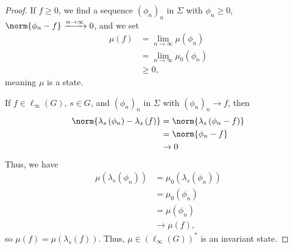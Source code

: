 \documentclass[10pt]{mypackage}
\begin{document}
\begin{proof}
  If $f \geq 0$, we find a sequence $\left(\phi_n\right)_n$ in $\Sigma$ with $\phi_n\geq 0$, $\norm{\phi_n - f}\xrightarrow{n\rightarrow\infty} 0$, and we set
  \begin{align*}
    \mu\left(f\right) &= \lim_{n\rightarrow\infty}\mu\left(\phi_n\right)\\
                      &= \lim_{n\rightarrow\infty}\mu_0\left(\phi_n\right)\\
                      &\geq 0,
  \end{align*}
  meaning $\mu$ is a state.\newline

  If $f\in \ell_{\infty}\left(G\right)$, $s\in G$, and $\left(\phi_n\right)_n$ in $\Sigma$ with $\left(\phi_n\right)_n\rightarrow f$, then
  \begin{align*}
    \norm{\lambda_s\left(\phi_n\right) - \lambda_s\left(f\right)} &= \norm{\lambda_s\left(\phi_n - f\right)}\\
                                                                  &= \norm{\phi_n - f}\\
                                                                  &\rightarrow 0
  \end{align*}
  Thus, we have
  \begin{align*}
    \mu\left(\lambda_s\left(\phi_n\right)\right) &= \mu_0\left(\lambda_s\left(\phi_n\right)\right)\\
                                                 &= \mu_0\left(\phi_n\right)\\
                                                 &= \mu\left(\phi_n\right)\\
                                                 &\rightarrow \mu\left(f\right),
  \end{align*}
  so $\mu\left(f\right) = \mu\left(\lambda_s\left(f\right)\right)$. Thus, $\mu\in \left(\ell_{\infty}\left(G\right)\right)^{\ast}$ is an invariant state.
\end{proof}
\end{document}
